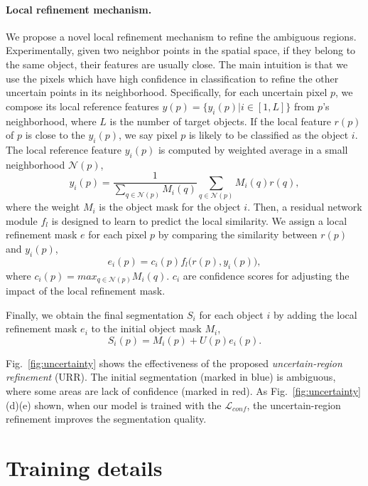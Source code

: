 \documentclass{article}
\begin{document}
\paragraph{Local refinement mechanism.}
We propose a novel local refinement mechanism to refine the ambiguous regions.
Experimentally, given two neighbor points in the spatial space, if they belong to the same object, their features are usually close.
The main intuition is that we use the pixels which have high confidence in classification to refine the other uncertain points in its neighborhood.
Specifically, for each uncertain pixel $p$, we compose its local reference features $y(p) = \{y_i(p)|i\in[1, L]\}$ from $p$'s neighborhood, where $L$ is the number of target objects.
If the local feature $r(p)$ of $p$ is close to the $y_i(p)$, we say pixel $p$ is likely to be classified as the object $i$.
The local reference feature $y_i(p)$ is computed by weighted average in a small neighborhood $\mathcal{N}(p)$,
\begin{equation}
  y_i(p) = \frac{1}{\sum_{q\in \mathcal{N}(p)} M_i(q)} \sum_{q\in \mathcal{N}(p)} M_i(q)r(q),
\end{equation}
where the weight $M_i$ is the object mask for the object $i$.
Then, a residual network module $f_l$ is designed to learn to predict the local similarity.
We assign a local refinement mask $e$ for each pixel $p$ by comparing the similarity between $r(p)$ and $y_i(p)$,
\begin{equation}
  e_i(p) = c_i(p)f_l\big(r(p), y_i(p)\big),
\end{equation}
where $c_i(p) = max_{q\in \mathcal{N}(p)} M_i(q)$.
$c_i$ are confidence scores for adjusting the impact of the local refinement mask.

Finally, we obtain the final segmentation $S_i$ for each object $i$ by adding the local refinement mask $e_i$ to the initial object mask $M_i$,
\begin{equation}
  S_i(p) = M_i(p) + U(p)e_i(p).
\end{equation}

Fig.~\ref{fig:uncertainty} shows the effectiveness of the proposed \emph{uncertain-region refinement} (URR).
The initial segmentation (marked in blue) is ambiguous, where some areas are lack of confidence (marked in red).
As Fig.~\ref{fig:uncertainty} (d)(e) shown, when our model is trained with the $\mathcal{L}_{conf}$, the uncertain-region refinement improves the segmentation quality.


\section{Training details}
\end{document}
